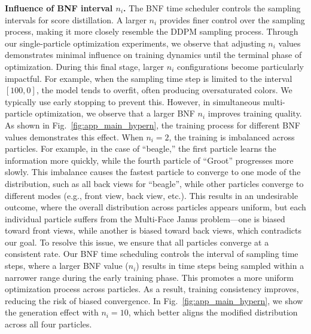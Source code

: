 \textbf{Influence of BNF interval $n_i$.} The BNF time scheduler controls the sampling intervals for score distillation. A larger $n_i$ provides finer control over the sampling process, making it more closely resemble the DDPM sampling process. Through our single-particle optimization experiments, we observe that adjusting $n_i$ values demonstrates minimal influence on training dynamics until the terminal phase of optimization. During this final stage, larger $n_i$ configurations become particularly impactful. For example, when the sampling time step is limited to the interval $[100, 0]$, the model tends to overfit, often producing oversaturated colors. We typically use early stopping to prevent this. However, in simultaneous multi-particle optimization, we observe that a larger BNF $n_i$ improves training quality. As shown in Fig.~\ref{fig:app_main_hypern}, the training process for different BNF values demonstrates this effect. When $n_i=2$, the training is imbalanced across particles. For example, in the case of ``beagle,'' the first particle learns the information more quickly, while the fourth particle of ``Groot'' progresses more slowly. This imbalance causes the fastest particle to converge to one mode of the distribution, such as all back views for ``beagle'', while other particles converge to different modes (e.g., front view, back view, etc.). This results in an undesirable outcome, where the overall distribution across particles appears uniform, but each individual particle suffers from the Multi-Face Janus problem—one is biased toward front views, while another is biased toward back views, which contradicts our goal. To resolve this issue, we ensure that all particles converge at a consistent rate. Our BNF time scheduling controls the interval of sampling time steps, where a larger BNF value ($n_i$) results in time steps being sampled within a narrower range during the early training phase. This promotes a more uniform optimization process across particles. As a result, training consistency improves, reducing the risk of biased convergence. In Fig.~\ref{fig:app_main_hypern}, we show the generation effect with $n_i=10$, which better aligns the modified distribution across all four particles.



